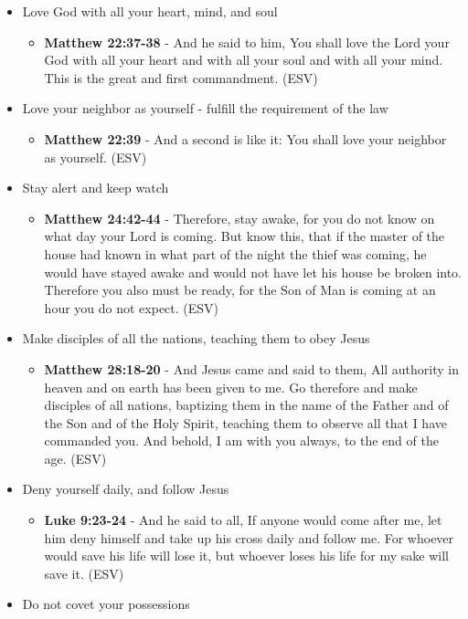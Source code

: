 \documentclass[11pt]{article}
\begin{document}
\begin{itemize}
\begin{itemize}
\end{itemize}
\item Love God with all your heart, mind, and soul
\begin{itemize}
\item \textbf{Matthew 22:37-38} - And he said to him, You shall love the Lord your God with all your heart and with all your soul and with all your mind. This is the great and first commandment. (ESV)
\end{itemize}
\item Love your neighbor as yourself - fulfill the requirement of the law
\begin{itemize}
\item \textbf{Matthew 22:39} - And a second is like it: You shall love your neighbor as yourself. (ESV)
\end{itemize}
\item Stay alert and keep watch
\begin{itemize}
\item \textbf{Matthew 24:42-44} - Therefore, stay awake, for you do not know on what day your Lord is coming. But know this, that if the master of the house had known in what part of the night the thief was coming, he would have stayed awake and would not have let his house be broken into. Therefore you also must be ready, for the Son of Man is coming at an hour you do not expect. (ESV)
\end{itemize}
\item Make disciples of all the nations, teaching them to obey Jesus
\begin{itemize}
\item \textbf{Matthew 28:18-20} - And Jesus came and said to them, All authority in heaven and on earth has been given to me. Go therefore and make disciples of all nations, baptizing them in the name of the Father and of the Son and of the Holy Spirit, teaching them to observe all that I have commanded you. And behold, I am with you always, to the end of the age. (ESV)
\end{itemize}
\item Deny yourself daily, and follow Jesus
\begin{itemize}
\item \textbf{Luke 9:23-24} - And he said to all, If anyone would come after me, let him deny himself and take up his cross daily and follow me. For whoever would save his life will lose it, but whoever loses his life for my sake will save it. (ESV)
\end{itemize}
\item Do not covet your possessions

\end{itemize}
\end{document}
